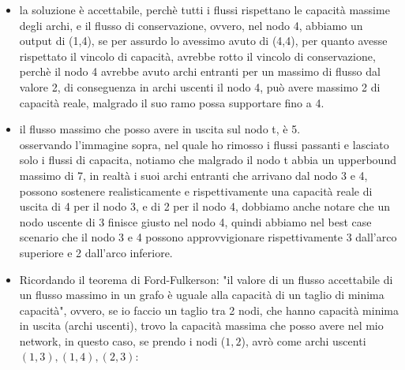 \documentclass{article}
\begin{document}
\begin{itemize}
	
\item la soluzione è accettabile, perchè tutti i flussi rispettano le capacità massime degli archi, e il flusso di conservazione, ovvero, nel nodo 4, abbiamo un output di (1,4), se per assurdo lo avessimo avuto di (4,4), per quanto avesse rispettato il vincolo di capacità, avrebbe rotto il vincolo di conservazione, perchè il nodo 4 avrebbe avuto archi entranti per un massimo di flusso dal valore 2, di conseguenza in archi uscenti il nodo 4, può avere massimo 2 di capacità reale, malgrado il suo ramo possa supportare fino a 4.\\

\begin{center}
\end{center}
\item il flusso massimo che posso avere in uscita sul nodo t, è 5.\\
osservando l'immagine sopra, nel quale ho rimosso i flussi passanti e lasciato solo i flussi di capacita, notiamo che malgrado il nodo t abbia un upperbound massimo di 7, in realtà i suoi archi entranti che arrivano dal nodo 3 e 4, possono sostenere realisticamente e rispettivamente una capacità reale di uscita di 4 per il nodo 3, e di 2 per il nodo 4, dobbiamo anche notare che un nodo uscente di 3 finisce giusto nel nodo 4, quindi abbiamo nel best case scenario che il nodo 3 e 4 possono approvvigionare rispettivamente 3 dall'arco superiore e 2 dall'arco inferiore.

\item Ricordando il teorema di Ford-Fulkerson: "il valore di un flusso accettabile di un flusso massimo in un grafo è uguale alla capacità di un taglio di minima capacità", ovvero, se io faccio un taglio tra 2 nodi, che hanno capacità minima in uscita (archi uscenti), trovo la capacità massima che posso avere nel mio network, in questo caso, se prendo i nodi ($1,2$), avrò come archi uscenti {$(1,3),(1,4),(2,3)$}:
\begin{center}
\end{center}
\end{itemize}
\end{document}
